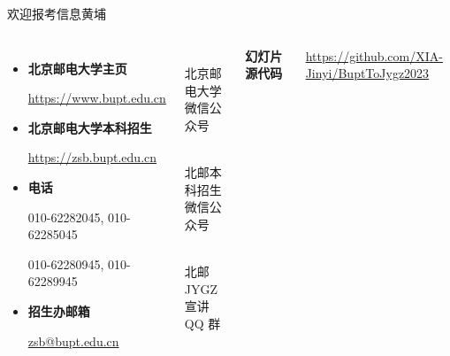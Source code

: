 \documentclass[aspectratio=169, utf8]{beamer}
\begin{document}
\begin{frame}{欢迎报考信息黄埔}
    \small
    \begin{columns}
        \begin{itemize}
            \item \textcolor{Fore}{\textbf{北京邮电大学主页}}

                  \href{https://www.bupt.edu.cn}{https://www.bupt.edu.cn}

            \item \textcolor{Fore}{\textbf{北京邮电大学本科招生}}

                  \href{https://zsb.bupt.edu.cn}{https://zsb.bupt.edu.cn}

            \item \textcolor{Fore}{\textbf{电话}}

                  010-62282045, 010-62285045

                  010-62280945, 010-62289945

            \item \textcolor{Fore}{\textbf{招生办邮箱}}

                  \href{mailto://zsb@bupt.edu.cn}{zsb@bupt.edu.cn}
        \end{itemize}

        \begin{multicols}{3}
            \begin{center}
                \\[1em]

                \scriptsize
                北京邮电大学\\微信公众号
            \end{center}

            \begin{center}
                \\[1em]

                \scriptsize
                北邮本科招生\\微信公众号
            \end{center}

            \begin{center}
                \\[1em]

                \scriptsize
                北邮 JYGZ\\宣讲 QQ 群
            \end{center}

        \end{multicols}

        \textcolor{Fore}{\textbf{幻灯片源代码}}

        \href{https://github.com/XIA-Jinyi/BuptToJygz2023}{https://github.com/XIA-Jinyi/BuptToJygz2023}
    \end{columns}
\end{frame}
\end{document}
